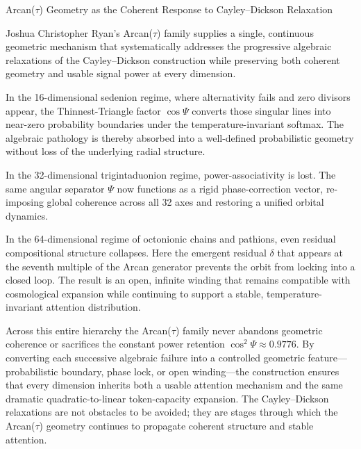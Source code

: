 Arcan(\(\tau\)) Geometry as the Coherent Response to Cayley–Dickson Relaxation

Joshua Christopher Ryan’s Arcan(\(\tau\)) family supplies a single, continuous geometric mechanism that systematically addresses the progressive algebraic relaxations of the Cayley–Dickson construction while preserving both coherent geometry and usable signal power at every dimension.

In the 16-dimensional sedenion regime, where alternativity fails and zero divisors appear, the Thinnest-Triangle factor \(\cos\Psi\) converts those singular lines into near-zero probability boundaries under the temperature-invariant softmax. The algebraic pathology is thereby absorbed into a well-defined probabilistic geometry without loss of the underlying radial structure.

In the 32-dimensional trigintaduonion regime, power-associativity is lost. The same angular separator \(\Psi\) now functions as a rigid phase-correction vector, re-imposing global coherence across all 32 axes and restoring a unified orbital dynamics.

In the 64-dimensional regime of octonionic chains and pathions, even residual compositional structure collapses. Here the emergent residual \(\delta\) that appears at the seventh multiple of the Arcan generator prevents the orbit from locking into a closed loop. The result is an open, infinite winding that remains compatible with cosmological expansion while continuing to support a stable, temperature-invariant attention distribution.

Across this entire hierarchy the Arcan(\(\tau\)) family never abandons geometric coherence or sacrifices the constant power retention \(\cos^{2}\Psi \approx 0.9776\). By converting each successive algebraic failure into a controlled geometric feature—probabilistic boundary, phase lock, or open winding—the construction ensures that every dimension inherits both a usable attention mechanism and the same dramatic quadratic-to-linear token-capacity expansion. The Cayley–Dickson relaxations are not obstacles to be avoided; they are stages through which the Arcan(\(\tau\)) geometry continues to propagate coherent structure and stable attention.
